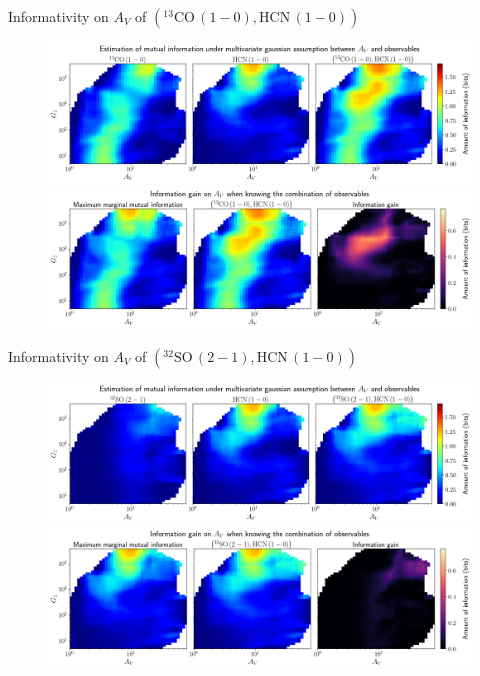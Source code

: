 \documentclass{beamer}
\begin{document}
\begin{frame}{Informativity on $A_V$ of $\left(\mathrm{^{13}CO\,(1-0)},\mathrm{HCN\,(1-0)}\right)$}
    \begin{figure}
        \centering
        \includegraphics[width=0.95\linewidth]{../linearinfo/av__13co10_hcn10_linearinfo.png}
        \vfill
        \includegraphics[width=0.95\linewidth]{../linearinfo/av__13co10_hcn10_linearinfo_gain.png}
    \end{figure}
\end{frame}

\begin{frame}{Informativity on $A_V$ of $\left(\mathrm{^{32}SO\,(2-1)},\mathrm{HCN\,(1-0)}\right)$}
    \begin{figure}
        \centering
        \includegraphics[width=0.95\linewidth]{../linearinfo/av__32so21_hcn10_linearinfo.png}
        \vfill
        \includegraphics[width=0.95\linewidth]{../linearinfo/av__32so21_hcn10_linearinfo_gain.png}
    \end{figure}
\end{frame}
\end{document}
